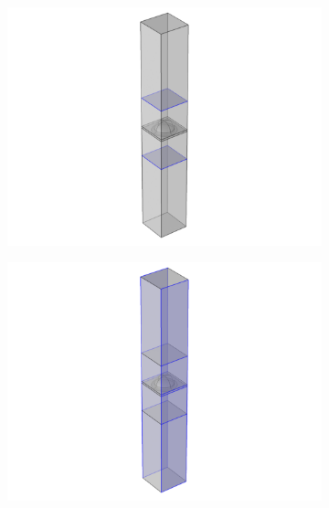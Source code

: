 \begin{figure}[htb]
    \begin{subfigure}{0.19\textwidth}
        \centering
        \includegraphics[width=1\linewidth, trim=55cm 0 45cm 0cm, clip]{figures/ch4/implem/ewfd/ewfd_ports__.png}
        \caption{}
        \label{fig:implementation_ewfd_ports}
    \end{subfigure}
    \begin{subfigure}{0.19\textwidth}
        \centering
        \includegraphics[width=1\linewidth, trim=55cm 0 45cm 0cm, clip]{figures/ch4/implem/ewfd/ewfd_pc1__.png}
        \caption{}
        \label{fig:implementation_ewfd_pc1}
    \end{subfigure}

\end{figure}
